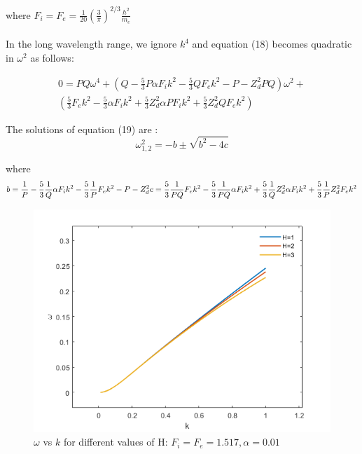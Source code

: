 \documentclass[journal]{IEEEtran}
\begin{document}
		where $F_i = F_e = \frac{1}{20}(\frac{3}{\pi})^{2/3} \frac{h^2}{m_e}$\\ \\
		In the long wavelength range, we ignore $k^4$ and equation (18) becomes quadratic in $\omega^2$ as follows:
	
		\begin{equation}
			\begin{split}
				0 =	PQ\omega^4 + (Q - \frac{5}{3}P\alpha F_ik^2 - 	\frac{5}{3}QF_ek^2 - P - Z_d^2PQ)\omega^2 + \\(\frac{5}{3}F_ek^2  - \frac{5}{3}\alpha F_ik^2 + \frac{5}{3}Z_d^2\alpha PF_ik^2 + \frac{5}{3}Z_d^2QF_ek^2)
			\end{split}
		\end{equation}
	
		The solutions of equation (19) are : 
			$$\omega_{1,2}^2 = - b \pm \sqrt{b^2 - 4c}$$

		where
		\begin{equation*}
			b = \frac{1}{P} - \frac{5}{3}\frac{1}{Q}\alpha F_ik^2 - \frac{5}{3}\frac{1}{P}F_ek^2 -  P - Z_d^2 \\
			c = \frac{5}{3}\frac{1}{PQ}F_ek^2 - \frac{5}{3}\frac{1}{PQ}\alpha F_ik^2 + \frac{5}{3}\frac{1}{Q}Z_d^2\alpha F_ik^2 + \frac{5}{3}\frac{1}{P}Z_d^2F_ek^2
		\end{equation*}

	\begin{figure}[h!]
			\centering
			\includegraphics[width =1\linewidth]{"ldr omega vs k"}
			\caption{$\omega$ vs $k$ for different values of H: $F_i = F_e = 1.517, \alpha = 0.01$}
			\label{fig:fig1}
		\end{figure}
\end{document}
